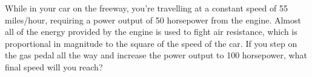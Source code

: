 While in your car on the freeway, you're travelling at a constant
speed of 55 miles/hour, requiring a power output of 50
horsepower from the engine. Almost all of the energy provided by the
engine is used to fight air resistance, which is
proportional in magnitude to the square of the speed of the car. If
you step on the gas pedal all the way and increase the power output
to 100 horsepower, what final speed will you reach?\answercheck
